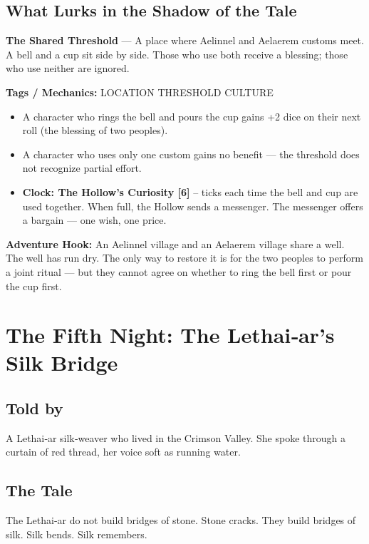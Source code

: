 \documentclass[10pt,twoside]{book}
\newcommand{\tag}[1]{\textsc{#1}}
\begin{document}
\section*{What Lurks in the Shadow of the Tale}
\begin{infobox}
\textbf{The Shared Threshold} --- A place where Aelinnel and Aelaerem customs meet. A bell and a cup sit side by side. Those who use both receive a blessing; those who use neither are ignored.

\textbf{Tags / Mechanics:} \tag{LOCATION} \tag{THRESHOLD} \tag{CULTURE}

\begin{itemize}
\item A character who rings the bell and pours the cup gains +2 dice on their next roll (the blessing of two peoples).
\item A character who uses only one custom gains no benefit --- the threshold does not recognize partial effort.
\item \textbf{Clock: The Hollow's Curiosity [6]} -- ticks each time the bell and cup are used together. When full, the Hollow sends a messenger. The messenger offers a bargain --- one wish, one price.
\end{itemize}

\textbf{Adventure Hook:} An Aelinnel village and an Aelaerem village share a well. The well has run dry. The only way to restore it is for the two peoples to perform a joint ritual --- but they cannot agree on whether to ring the bell first or pour the cup first.
\end{infobox}

\chapter{The Fifth Night: The Lethai‑ar's Silk Bridge}

\section*{Told by}
A Lethai‑ar silk‑weaver who lived in the Crimson Valley. She spoke through a curtain of red thread, her voice soft as running water.

\section*{The Tale}
The Lethai‑ar do not build bridges of stone. Stone cracks. They build bridges of silk. Silk bends. Silk remembers.
\end{document}

